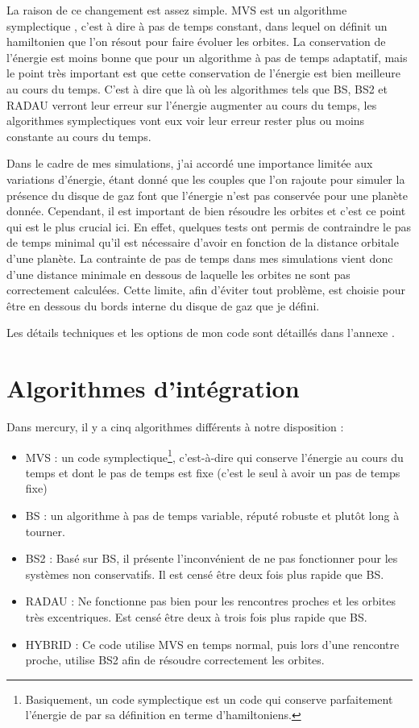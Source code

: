 La raison de ce changement est assez simple. MVS est un algorithme symplectique \citep{wisdom1991symplectic}, c'est à dire à pas de temps constant, dans lequel on définit un hamiltonien que l'on résout pour faire évoluer les orbites. La conservation de l'énergie est moins bonne que pour un algorithme à pas de temps adaptatif, mais le point très important est que cette conservation de l'énergie est bien meilleure au cours du temps. C'est à dire que là où les algorithmes tels que BS, BS2 et RADAU verront leur erreur sur l'énergie augmenter au cours du temps, les algorithmes symplectiques vont eux voir leur erreur rester plus ou moins constante au cours du temps. 

Dans le cadre de mes simulations, j'ai accordé une importance limitée aux variations d'énergie, étant donné que les couples que l'on rajoute pour simuler la présence du disque de gaz font que l'énergie n'est pas conservée pour une planète donnée. Cependant, il est important de bien résoudre les orbites et c'est ce point qui est le plus crucial ici. En effet, quelques tests ont permis de contraindre le pas de temps minimal qu'il est nécessaire d'avoir en fonction de la distance orbitale d'une planète. La contrainte de pas de temps dans mes simulations vient donc d'une distance minimale en dessous de laquelle les orbites ne sont pas correctement calculées. Cette limite, afin d'éviter tout problème, est choisie pour être en dessous du bords interne du disque de gaz que je défini.

Les détails techniques et les options de mon code sont détaillés dans l'annexe .

\section{Algorithmes d'intégration}
Dans mercury, il y a cinq algorithmes différents à notre disposition :
\begin{itemize}
\item MVS \citep{wisdom1991symplectic} : un code symplectique\footnote{Basiquement, un code symplectique est un code qui conserve parfaitement l'énergie de par sa définition en terme d'hamiltoniens.}, c'est-à-dire qui conserve l'énergie au cours du temps et dont le pas de temps est fixe (c'est le seul à avoir un pas de temps fixe)
\item BS \citep{stoer1980introduction} : un algorithme à pas de temps variable, réputé robuste et plutôt long à tourner.
\item BS2 \citep{press1992numerical} : Basé sur BS, il présente l'inconvénient de ne pas fonctionner pour les systèmes non conservatifs. Il est censé être deux fois plus rapide que BS.
\item RADAU \citep{everhart1985efficient} : Ne fonctionne pas bien pour les rencontres proches et les orbites très excentriques. Est censé être deux à trois fois plus rapide que BS.
\item HYBRID \citep{chambers1999hybrid} : Ce code utilise MVS en temps normal, puis lors d'une rencontre proche, utilise BS2 afin de résoudre correctement les orbites.
\end{itemize}

